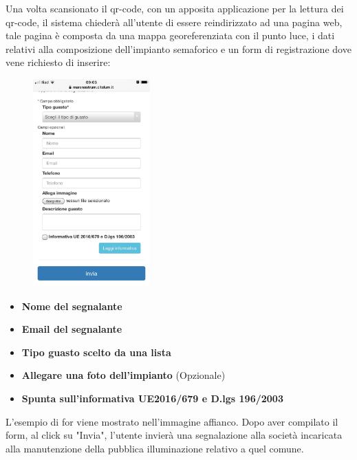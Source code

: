 Una volta scansionato il qr-code, con un apposita applicazione per la lettura dei qr-code, il sistema chiederà all'utente di essere reindirizzato ad una pagina web, tale pagina è composta da una mappa georeferenziata con il punto luce, i dati relativi alla composizione dell'impianto semaforico e un form di registrazione dove vene richiesto di inserire:
\begin{figure}
    \includegraphics[width=0.40\textwidth]{img/faro/qrlonato2.jpg}
\end{figure}
\begin{itemize}
  \item \textbf{Nome del segnalante}
  \item \textbf{Email del segnalante}
  \item \textbf{Tipo guasto scelto da una lista}
  \item \textbf{Allegare una foto dell'impianto} (Opzionale)
  \item \textbf{Spunta sull'informativa UE2016/679 e D.lgs 196/2003}
\end{itemize}

L'esempio di for viene mostrato nell'immagine affianco. Dopo aver compilato il form, al click su "Invia", l'utente invierà una segnalazione alla società incaricata alla manutenzione della pubblica illuminazione relativo a quel comune.

